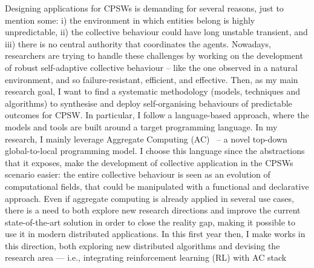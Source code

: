 \documentclass[11pt]{article}
\begin{document}
Designing applications for CPSWs is demanding for several reasons, just to mention some:
 i) the environment in which entities belong is highly unpredictable,
 ii) the collective behaviour could have long unstable transient, and
 iii) there is no central authority that coordinates the agents. 
%
Nowadays, researchers are trying to handle these challenges by working 
 on the development of robust self-adaptive collective behaviour -- 
 like the one observed in a natural environment, and so failure-resistant, efficient, and effective. 
%
Then, as my main research goal, I want to find a systematic methodology (models, techniques and algorithms) 
 to synthesise and deploy self-organising behaviours of predictable outcomes for CPSW.
%
In particular, I follow a language-based approach, where the models and tools are built around
 a target programming language.
%
In my research, 
 I mainly leverage Aggregate Computing (AC)~\cite{beal2015aggregate} – a novel top-down global-to-local programming model. 
%
I choose this language since the abstractions that it exposes, 
 make the development of collective application in the CPSWs scenario easier:
 the entire collective behaviour is seen as an evolution of computational fields,
 that could be manipulated with a functional and declarative approach.
%
Even if aggregate computing is already applied in several use cases, 
 there is a need to both explore new research directions and
 improve the current state-of-the-art solution in order to close the reality gap, 
 making it possible to use it in modern distributed applications.
%
In this first year then, 
 I make works in this direction, 
 both exploring new distributed algorithms and devising the research area 
 --- i.e., integrating reinforcement learning (RL) with AC stack 
\end{document}
